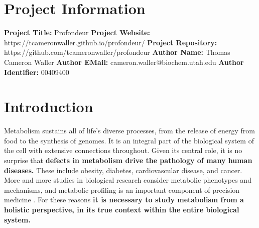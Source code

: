 

\section{Project Information}
\noindent
\textbf{Project Title:} Profondeur\newline
\textbf{Project Website:} https://tcameronwaller.github.io/profondeur/\newline
\textbf{Project Repository:} https://github.com/tcameronwaller/profondeur\newline
\textbf{Author Name:} Thomas Cameron Waller\newline
\textbf{Author EMail:} cameron.waller@biochem.utah.edu\newline
\textbf{Author Identifier:} 00409400

\section{Introduction}

Metabolism sustains all of life's diverse processes, from the release of energy from food to the synthesis of genomes.
It is an integral part of the biological system of the cell with extensive connections throughout.
Given its central role, it is no surprise that \textbf{defects in metabolism drive the pathology of many human diseases\supercite{van_der_klaauw_hunger_2015, haslam_obesity_2005}.}
These include obesity, diabetes, cardiovascular disease, and cancer.
More and more studies in biological research consider metabolic phenotypes and mechanisms, and metabolic profiling is an important component of precision medicine \supercite{beebe_sharpening_2016, benson_clinical_2016, collins_new_2015, zhang_forward_2015, topol_individualized_2014}.
For these reasons \textbf{it is necessary to study metabolism from a holistic perspective, in its true context within the entire biological system.}

